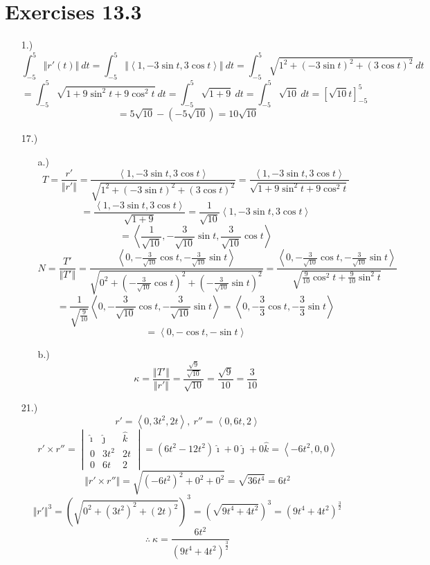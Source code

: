 \documentclass[12pt]{article}
\newcommand{\angleb}[1]{\left\langle#1\right\rangle}
\newcommand{\bracks}[1]{\left[#1\right]}
\newcommand{\parns}[1]{\left(#1\right)}
\begin{document}
\section*{Exercises 13.3}
\begin{itemize}
    \item [1.)] \[\int_{-5}^{5}\Vert r'(t)\Vert\ dt=\int_{-5}^{5}\Vert\angleb{1,-3\sin t,3\cos t}\Vert\ dt=\int_{-5}^{5}\sqrt{1^2+(-3\sin t)^2+(3\cos t)^2}\ dt\]
          \[=\int_{-5}^{5}\sqrt{1+9\sin^2t+9\cos^2t}\ dt=\int_{-5}^{5}\sqrt{1+9}\ dt=\int_{-5}^{5}\sqrt{10}\ dt=\bracks{\sqrt{10}t}_{-5}^5\]
          \[=5\sqrt{10}-(-5\sqrt{10})=10\sqrt{10}\]

    \item [17.)] \begin{itemize}
              \item [a.)]
                    \[T=\frac{r'}{\Vert r'\Vert}=\frac{\angleb{1,-3\sin t,3\cos t}}{\sqrt{1^2+(-3\sin t)^2+(3\cos t)^2}}=\frac{\angleb{1,-3\sin t,3\cos t}}{\sqrt{1+9\sin^2t+9\cos^2t}}\]
                    \[=\frac{\angleb{1,-3\sin t,3\cos t}}{\sqrt{1+9}}=\frac{1}{\sqrt{10}}\angleb{1,-3\sin t,3\cos t}\]
                    \[=\angleb{\frac{1}{\sqrt{10}},-\frac{3}{\sqrt{10}}\sin t,\frac{3}{\sqrt{10}}\cos t}\]
                    \[N=\frac{T'}{\Vert T'\Vert}=\frac{\angleb{0,-\frac{3}{\sqrt{10}}\cos t,-\frac{3}{\sqrt{10}}\sin t}}{\sqrt{0^2+\left(-\frac{3}{\sqrt{10}}\cos t\right)^2+\parns{-\frac{3}{\sqrt{10}}\sin t}^2}}=\frac{\angleb{0,-\frac{3}{\sqrt{10}}\cos t,-\frac{3}{\sqrt{10}}\sin t}}{\sqrt{\frac{9}{10}\cos^2t+\frac{9}{10}\sin^2t}}\]
                    \[=\frac{1}{\sqrt{\frac{9}{10}}}\angleb{0,-\frac{3}{\sqrt{10}}\cos t,-\frac{3}{\sqrt{10}}\sin t}=\angleb{0,-\frac{3}{3}\cos t,-\frac{3}{3}\sin t}\]
                    \[=\angleb{0,-\cos t,-\sin t}\]

              \item [b.)] \[\kappa=\frac{\Vert T'\Vert}{\Vert r'\Vert}=\frac{\frac{\sqrt{9}}{\sqrt{10}}}{\sqrt{10}}=\frac{\sqrt{9}}{10}=\frac{3}{10}\]
          \end{itemize}

    \item [21.)] \[r'=\angleb{0,3t^2,2t},\ r''=\angleb{0,6t,2}\]
          \[r'\times r''=\begin{vmatrix}
                  \hat\imath & \hat\jmath & \hat{k} \\
                  0       & 3t^2    & 2t      \\0 & 6t & 2
              \end{vmatrix}=(6t^2-12t^2)\hat\imath+0\hat\jmath+0\hat{k}=\angleb{-6t^2,0,0}\]
          \[\Vert r'\times r''\Vert=\sqrt{(-6t^2)^2+0^2+0^2}=\sqrt{36t^4}=6t^2\]
          \[\Vert r'\Vert^3=\parns{\sqrt{0^2+(3t^2)^2+(2t)^2}}^3=\parns{\sqrt{9t^4+4t^2}}^3=\parns{9t^4+4t^2}^{\frac{3}{2}}\]
          \[\therefore\ \kappa=\frac{6t^2}{\parns{9t^4+4t^2}^{\frac{3}{2}}}\]


\end{itemize}
\end{document}
